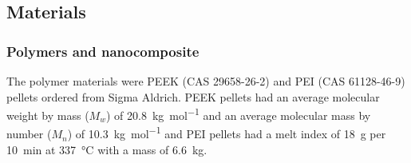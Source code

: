 \documentclass[11pt,review,times]{elsarticle}
\begin{document}
\begin{table}[htb]
\center
{}
\caption{Material properties}
\label{tab:material_properties}
\end{table}


\subsection{Materials}

\subsubsection{Polymers and nanocomposite}

The polymer materials were PEEK (CAS 29658-26-2) and PEI (CAS 61128-46-9) pellets ordered from Sigma Aldrich. 
PEEK pellets had an average molecular weight by mass ($M_w$) of \SI{20,8}{\kilo\gram\per\mol} and an average molecular mass by number ($M_n$) of \SI{10,3}{\kilo\gram\per\mol} and PEI pellets had a melt index of \SI{18}{\gram} per \SI{10}{\minute} at \SI{337}{\celsius} with a mass of \SI{6.6}{\kilogram}. 
\end{document}
